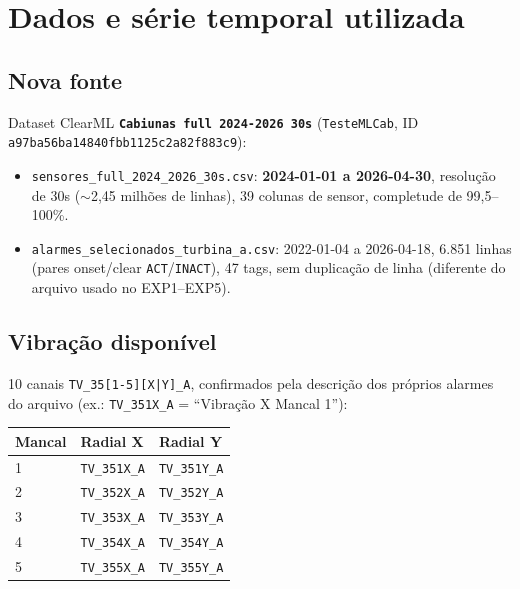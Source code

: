 \documentclass[11pt,a4paper]{article}
\begin{document}
\section{Dados e série temporal utilizada}
\label{sec:dados}

\subsection{Nova fonte}

Dataset ClearML \textbf{\texttt{Cabiunas full 2024-2026 30s}}
(\texttt{TesteMLCab}, ID \texttt{a97ba56ba14840fbb1125c2a82f883c9}):

\begin{itemize}
  \item \texttt{sensores\_full\_2024\_2026\_30s.csv}: \textbf{2024-01-01 a
        2026-04-30}, resolução de 30s ($\sim$2,45 milhões de linhas), 39
        colunas de sensor, completude de 99,5--100\%.
  \item \texttt{alarmes\_selecionados\_turbina\_a.csv}: 2022-01-04 a
        2026-04-18, 6.851 linhas (pares onset/clear \texttt{ACT}/\texttt{INACT}),
        47 tags, sem duplicação de linha (diferente do arquivo usado no
        EXP1--EXP5).
\end{itemize}

\subsection{Vibração disponível}

10 canais \texttt{TV\_35[1-5][X|Y]\_A}, confirmados pela descrição dos
próprios alarmes do arquivo (ex.: \texttt{TV\_351X\_A} = ``Vibração X
Mancal 1''):

\begin{center}
\begin{tabular}{@{}lll@{}}
\toprule
Mancal & Radial X & Radial Y \\
\midrule
1 & \texttt{TV\_351X\_A} & \texttt{TV\_351Y\_A} \\
2 & \texttt{TV\_352X\_A} & \texttt{TV\_352Y\_A} \\
3 & \texttt{TV\_353X\_A} & \texttt{TV\_353Y\_A} \\
4 & \texttt{TV\_354X\_A} & \texttt{TV\_354Y\_A} \\
5 & \texttt{TV\_355X\_A} & \texttt{TV\_355Y\_A} \\
\bottomrule
\end{tabular}
\end{center}
\end{document}

